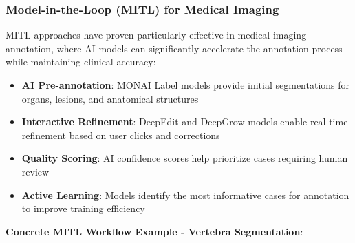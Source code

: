 \subsubsection{Model-in-the-Loop (MITL) for Medical Imaging}

MITL approaches \cite{monarch2021human} have proven particularly effective in medical imaging annotation, where AI models can significantly accelerate the annotation process while maintaining clinical accuracy:

\begin{itemize}
    \item \textbf{AI Pre-annotation}: MONAI Label models provide initial segmentations for organs, lesions, and anatomical structures
    \item \textbf{Interactive Refinement}: DeepEdit and DeepGrow models enable real-time refinement based on user clicks and corrections
    \item \textbf{Quality Scoring}: AI confidence scores help prioritize cases requiring human review
    \item \textbf{Active Learning}: Models identify the most informative cases for annotation to improve training efficiency
\end{itemize}

\textbf{Concrete MITL Workflow Example - Vertebra Segmentation}:

